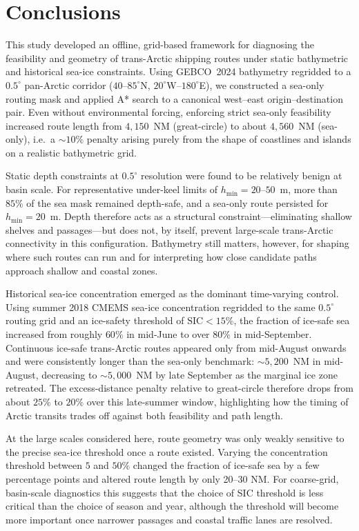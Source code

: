 \section{Conclusions}
\label{sec:conclusions}

This study developed an offline, grid-based framework for diagnosing the
feasibility and geometry of trans-Arctic shipping routes under static
bathymetric and historical sea-ice constraints.  Using GEBCO~2024
bathymetry regridded to a $0.5^{\circ}$ pan-Arctic corridor
($40$--$85^{\circ}$N, $20^{\circ}$W–$180^{\circ}$E), we constructed a
sea-only routing mask and applied A* search to a canonical west–east
origin–destination pair.  Even without environmental forcing, enforcing
strict sea-only feasibility increased route length from $4{,}150$~NM
(great-circle) to about $4{,}560$~NM (sea-only), i.e.\ a $\sim 10\%$
penalty arising purely from the shape of coastlines and islands on a
realistic bathymetric grid.

Static depth constraints at $0.5^{\circ}$ resolution were found to be
relatively benign at basin scale.  For representative under-keel limits
of $h_{\min}=20$–$50$~m, more than $85\%$ of the sea mask remained
depth-safe, and a sea-only route persisted for $h_{\min}=20$~m.
Depth therefore acts as a structural constraint---eliminating shallow
shelves and passages---but does not, by itself, prevent large-scale
trans-Arctic connectivity in this configuration.  Bathymetry still
matters, however, for shaping where such routes can run and for
interpreting how close candidate paths approach shallow and coastal
zones.

Historical sea-ice concentration emerged as the dominant
time-varying control.  Using summer 2018 CMEMS sea-ice concentration
regridded to the same $0.5^{\circ}$ routing grid and an ice-safety
threshold of $\mathrm{SIC}<15\%$, the fraction of ice-safe sea increased
from roughly $60\%$ in mid-June to over $80\%$ in mid-September.
Continuous ice-safe trans-Arctic routes appeared only from mid-August
onwards and were consistently longer than the sea-only benchmark:
$\sim 5{,}200$~NM in mid-August, decreasing to $\sim 5{,}000$~NM by
late September as the marginal ice zone retreated.  The excess-distance
penalty relative to great-circle therefore drops from about $25\%$ to
$20\%$ over this late-summer window, highlighting how the timing of
Arctic transits trades off against both feasibility and path length.

At the large scales considered here, route geometry was only weakly
sensitive to the precise sea-ice threshold once a route existed.
Varying the concentration threshold between $5$ and $50\%$ changed the
fraction of ice-safe sea by a few percentage points and altered
route length by only 20–30 NM.  For coarse-grid,
basin-scale diagnostics this suggests that the choice of SIC threshold
is less critical than the choice of season and year, although the
threshold will become more important once narrower passages and coastal
traffic lanes are resolved.

